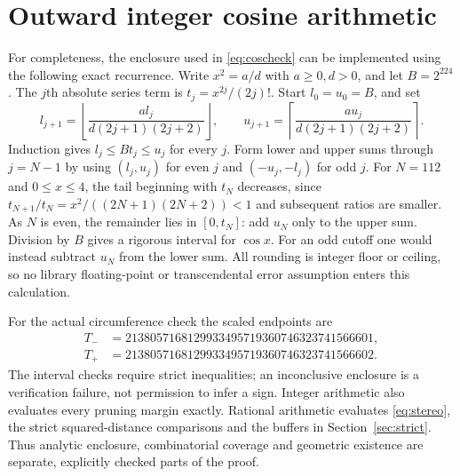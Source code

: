 \documentclass[11pt]{article}
\theoremstyle{definition}
\theoremstyle{remark}
\begin{document}
\section{Outward integer cosine arithmetic}\label{app:arithmetic}
For completeness, the enclosure used in \eqref{eq:coscheck} can be
implemented using the following exact recurrence. Write $x^2=a/d$ with
$a\ge0,d>0$, and let $B=2^{224}$. The $j$th absolute series term
is $t_j=x^{2j}/(2j)!$. Start $l_0=u_0=B$, and set
\[
 l_{j+1}=\left\lfloor\frac{a l_j}{d(2j+1)(2j+2)}\right\rfloor,
 \qquad
 u_{j+1}=\left\lceil\frac{a u_j}{d(2j+1)(2j+2)}\right\rceil.
\]
Induction gives $l_j\le Bt_j\le u_j$ for every $j$. Form lower and
upper sums through $j=N-1$ by using $(l_j,u_j)$ for even $j$ and
$(-u_j,-l_j)$ for odd $j$. For $N=112$ and $0\le x\le4$, the
tail beginning with $t_N$ decreases, since
$t_{N+1}/t_N=x^2/((2N+1)(2N+2))<1$ and subsequent ratios are
smaller. As $N$ is even, the remainder lies in $[0,t_N]$: add $u_N$
only to the upper sum. Division by $B$ gives a rigorous interval for
$\cos x$. For an odd cutoff one would instead subtract $u_N$ from the
lower sum. All rounding is integer floor or ceiling, so no library
floating-point or transcendental error assumption enters this calculation.

For the actual circumference check the scaled endpoints are
\begin{align*}
T_-&=2138057168129933495719360746323741566601,\\
T_+&=2138057168129933495719360746323741566602.
\end{align*}
The interval checks require strict inequalities; an inconclusive enclosure
is a verification failure, not permission to infer a sign. Integer arithmetic
also evaluates every pruning margin exactly. Rational arithmetic evaluates
\eqref{eq:stereo}, the strict squared-distance comparisons and the buffers
in Section~\ref{sec:strict}. Thus analytic enclosure, combinatorial coverage
and geometric existence are separate, explicitly checked parts of the proof.
\end{document}
